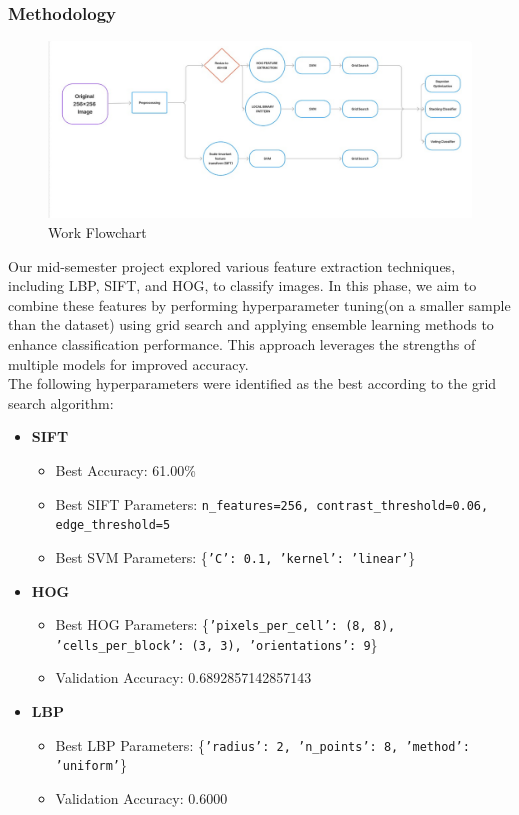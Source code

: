 \documentclass[10pt,twocolumn,letterpaper]{article}
\begin{document}
\subsubsection{Methodology}

\begin{figure}[H]
    \centering
    \includegraphics[width=\linewidth]{1.png}
    \caption{Work Flowchart}
\end{figure}

Our mid-semester project explored various feature extraction techniques, including LBP, SIFT, and HOG, to classify images. In this phase, we aim to combine these features by performing hyperparameter tuning(on a smaller sample than the dataset) using grid search and applying ensemble learning methods to enhance classification performance. This approach leverages the strengths of multiple models for improved accuracy.\\
The following hyperparameters were identified as the best according to the grid search algorithm:

\begin{itemize}[noitemsep, topsep=0pt]
    \item \textbf{SIFT}
    \begin{itemize}[noitemsep, topsep=0pt]
        \item Best Accuracy: 61.00\%
        \item Best SIFT Parameters: \texttt{n\_features=256, contrast\_threshold=0.06, edge\_threshold=5}
        \item Best SVM Parameters: \{\texttt{'C': 0.1, 'kernel': 'linear'}\}
    \end{itemize}

    \item \textbf{HOG}
    \begin{itemize}[noitemsep, topsep=0pt]
        \item Best HOG Parameters: \{\texttt{'pixels\_per\_cell': (8, 8), 'cells\_per\_block': (3, 3), 'orientations': 9}\}
        \item Validation Accuracy: 0.6892857142857143
    \end{itemize}

    \item \textbf{LBP}
    \begin{itemize}[noitemsep, topsep=0pt]
        \item Best LBP Parameters: \{\texttt{'radius': 2, 'n\_points': 8, 'method': 'uniform'}\}
        \item Validation Accuracy: 0.6000
    \end{itemize}
\end{itemize}
\end{document}
